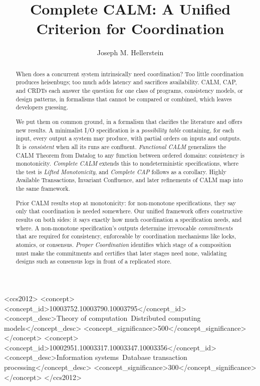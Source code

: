 \documentclass[sigconf]{cidr-2027}
\theoremstyle{remark}
\newcommand{\commitments}{commitments\xspace}
\newcommand{\spectype}[1][]{I/O specification#1\xspace}
\begin{document}
\title{Complete CALM: A Unified Criterion for Coordination}

\author{Joseph M. Hellerstein}

\begin{abstract}
When does a concurrent system intrinsically need coordination?  Too little
coordination produces heisenbugs; too much adds latency and sacrifices
availability.  CALM, CAP, and CRDTs each answer the question for one class of
programs, consistency models, or design patterns, in formalisms that cannot be
compared or combined, which leaves developers guessing.

We put them on common ground, in a formalism that clarifies the literature and
offers new results.  A minimalist \spectype is a \emph{possibility table} containing, for
each input, every output a system may produce, with partial orders on inputs and
outputs.  It is \emph{consistent} when all its runs are confluent.
\emph{Functional CALM} generalizes the CALM Theorem from Datalog to any function
between ordered domains: consistency is monotonicity.  \emph{Complete CALM}
extends this to nondeterministic specifications, where the test is
\emph{Lifted Monotonicity}, and \emph{Complete CAP} follows as a corollary.
Highly Available Transactions, Invariant Confluence, and later refinements of
CALM map into the same framework.

Prior CALM results stop at monotonicity: for non-monotone
specifications, they say only that coordination is needed somewhere.  Our
unified framework offers constructive results on both sides: it says exactly
how much coordination a specification needs, and where.  A non-monotone
specification's outputs determine irrevocable \emph{\commitments} that are required for consistency,
enforceable by coordination mechanisms like locks, atomics, or consensus.
\emph{Proper Coordination} identifies which stage of a composition must make the
\commitments and certifies that later stages need none, validating designs such
as consensus logs in front of a replicated store.
\end{abstract}

\begin{CCSXML}
<ccs2012>
<concept>
<concept_id>10003752.10003790.10003795</concept_id>
<concept_desc>Theory of computation~Distributed computing models</concept_desc>
<concept_significance>500</concept_significance>
</concept>
<concept>
<concept_id>10002951.10003317.10003347.10003356</concept_id>
<concept_desc>Information systems~Database transaction processing</concept_desc>
<concept_significance>300</concept_significance>
</concept>
</ccs2012>
\end{CCSXML}
\end{document}

